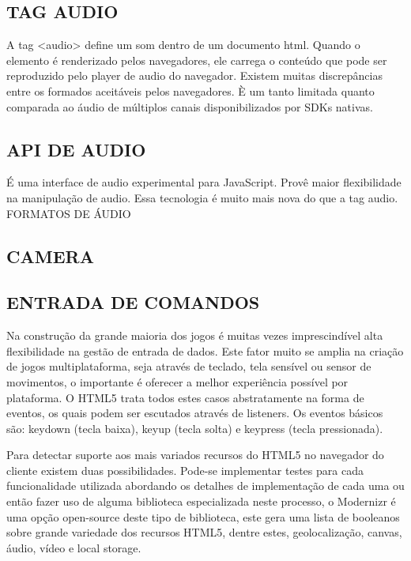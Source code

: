 \documentclass[11pt,a4paper]{article}
\begin{document}
\subsection{ TAG AUDIO}

A tag <audio> define um som dentro de um documento html. Quando o elemento é renderizado pelos navegadores, ele carrega o conteúdo que pode ser reproduzido pelo player de audio do navegador. Existem muitas discrepâncias entre os formados aceitáveis pelos navegadores. È um tanto limitada quanto comparada ao áudio de múltiplos canais disponibilizados por SDKs nativas.

\subsection{ API DE AUDIO}

É uma interface de audio experimental para JavaScript. Provê maior flexibilidade na manipulação de audio. Essa tecnologia é muito mais nova do que a tag audio.
FORMATOS DE ÁUDIO

\subsection{ CAMERA}

\subsection{ ENTRADA DE COMANDOS}

Na construção da grande maioria dos jogos é muitas vezes imprescindível alta flexibilidade na gestão de entrada de dados. Este fator muito se amplia na criação de jogos multiplataforma, seja através de teclado, tela sensível ou sensor de movimentos, o importante é oferecer a melhor experiência possível por plataforma. O HTML5 trata todos estes casos abstratamente na forma de eventos, os quais podem ser escutados através de listeners. Os eventos básicos são: keydown (tecla baixa), keyup (tecla solta) e keypress (tecla pressionada).

Para detectar suporte aos mais variados recursos do HTML5 no navegador do cliente existem duas possibilidades. Pode-se implementar testes para cada funcionalidade utilizada abordando os detalhes de implementação de cada uma ou então fazer uso de alguma biblioteca especializada neste processo, o Modernizr é uma opção open-source deste tipo de biblioteca, este gera uma lista de booleanos sobre grande variedade dos recursos HTML5, dentre estes, geolocalização, canvas, áudio, vídeo e local storage.
\end{document}
